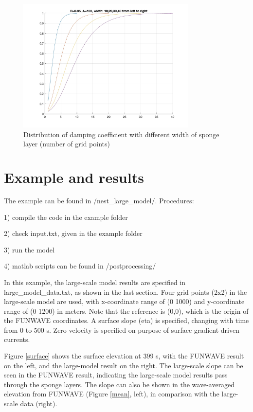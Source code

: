 \documentclass[preprint,10pt]{elsarticle}
\begin{document}
  \begin{figure}
\begin{center}
 \includegraphics[width=0.8\textwidth]{figures/test_sponge_width.jpg}
 \caption{Distribution of damping coefficient with different width of sponge layer (number of grid points) }
 \label{width}
 \end{center}
 \end{figure}  
   
\section{Example and results}

The example can be found in /nest\_large\_model/. Procedures:

1) compile the code in the example folder

2) check input.txt, given in the example folder

3) run the model

4) matlab scripts can be found in /postprocessing/

\vspace{0.5cm}
\noindent
In this example,  the large-scale model results are specified in large\_model\_data.txt, as shown in the last section. Four grid points (2x2) in the large-scale model  are used, with x-coordinate range of (0 1000) and y-coordinate range of (0 1200) in meters. Note that the reference is (0,0), which is the origin of the FUNWAVE coordinates. A surface slope (eta) is specified, changing with time from 0 to 500 s. Zero velocity is specified on purpose of surface gradient driven currents. 

Figure \ref{surface} shows the surface elevation at 399 s, with the FUNWAVE result on the left, and the large-model result on the right. The large-scale slope can be seen in the FUNWAVE result, indicating the large-scale model results pass through the sponge layers. The slope can also be shown in the wave-averaged elevation from FUNWAVE (Figure \ref{mean}, left), in comparison with the large-scale data (right). 
\end{document}
